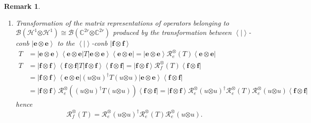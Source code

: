 \documentclass[aps,preprint]{revtex4}%
\newtheorem{remark}[theorem]{Remark}
\begin{document}
\begin{remark}
\begin{enumerate}
\begin{enumerate}
\item Transformation of the matrix representations of operators belonging to
$\mathcal{B}\left(  \mathcal{H}^{1}\mathbf{\otimes}\mathcal{H}^{1}\right)
\cong\mathcal{B}\left(  \mathbb{C}^{2r}\mathbf{\otimes}\mathbb{C}^{2r}\right)
$ produced by the transformation between $\left\langle \left.  {}\right\vert
\right\rangle $-conb $\left\vert \mathbf{e\otimes e}\right\rangle $ to the
$\left\langle \left.  {}\right\vert \right\rangle $-conb $\left\vert
\mathbf{f\otimes f}\right\rangle $%
\begin{align}
T  &  =\left\vert \mathbf{e\otimes e}\right\rangle \left\langle
\mathbf{e\otimes e}\right\vert T\left\vert \mathbf{e\otimes e}\right\rangle
\left\langle \mathbf{e\otimes e}\right\vert =\left\vert \mathbf{e\otimes
e}\right\rangle \mathcal{R}_{e}^{\otimes}\left(  T\right)  \left\langle
\mathbf{e\otimes e}\right\vert \\
T  &  =\left\vert \mathbf{f\otimes f}\right\rangle \left\langle
\mathbf{f\otimes f}\right\vert T\left\vert \mathbf{f\otimes f}\right\rangle
\left\langle \mathbf{f\otimes f}\right\vert =\left\vert \mathbf{f\otimes
f}\right\rangle \mathcal{R}_{f}^{\otimes}\left(  T\right)  \left\langle
\mathbf{f\otimes f}\right\vert \\
&  =\left\vert \mathbf{f\otimes f}\right\rangle \left\langle \mathbf{e\otimes
e}\right\vert \left(  u\mathbf{\otimes}u\right)  ^{\dagger}T\left(
u\mathbf{\otimes}u\right)  \left\vert \mathbf{e\otimes e}\right\rangle
\left\langle \mathbf{f\otimes f}\right\vert \\
&  =\left\vert \mathbf{f\otimes f}\right\rangle \mathcal{R}_{e}^{\otimes
}\left(  \left(  u\mathbf{\otimes}u\right)  ^{\dagger}T\left(
u\mathbf{\otimes}u\right)  \right)  \left\langle \mathbf{f\otimes
f}\right\vert =\left\vert \mathbf{f\otimes f}\right\rangle \mathcal{R}%
_{e}^{\otimes}\left(  u\mathbf{\otimes}u\right)  ^{\dagger}\mathcal{R}%
_{e}^{\otimes}\left(  T\right)  \mathcal{R}_{e}^{\otimes}\left(
u\mathbf{\otimes}u\right)  \left\langle \mathbf{f\otimes f}\right\vert
\end{align}
hence
\begin{equation}
\mathcal{R}_{f}^{\otimes}\left(  T\right)  =\mathcal{R}_{e}^{\otimes}\left(
u\mathbf{\otimes}u\right)  ^{\dagger}\mathcal{R}_{e}^{\otimes}\left(
T\right)  \mathcal{R}_{e}^{\otimes}\left(  u\mathbf{\otimes}u\right)  .
\end{equation}

\end{enumerate}


\end{enumerate}
\end{remark}
\end{document}
